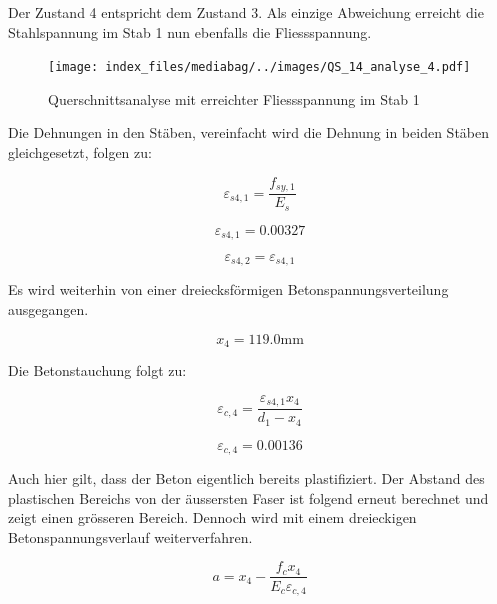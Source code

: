 \documentclass[
  12pt,
  letterpaper,
  egregdoesnotlikesansseriftitles]{scrreprt}
\begin{document}
Der Zustand 4 entspricht dem Zustand 3. Als einzige Abweichung erreicht
die Stahlspannung im Stab 1 nun ebenfalls die Fliessspannung.

\begin{figure}[H]

{\centering \texttt{[image: index\_files/mediabag/../images/QS\_14\_analyse\_4.pdf]}

}

\caption{\label{fig-qs5_sv14}Querschnittsanalyse mit erreichter
Fliessspannung im Stab 1}

\end{figure}

Die Dehnungen in den Stäben, vereinfacht wird die Dehnung in beiden
Stäben gleichgesetzt, folgen zu:

\begin{equation}\varepsilon_{s4,1} = \frac{f_{sy,1}}{E_{s}}\end{equation}

\begin{equation}\varepsilon_{s4,1} = 0.00327\end{equation}

\begin{equation}\varepsilon_{s4,2} = \varepsilon_{s4,1}\end{equation}

Es wird weiterhin von einer dreiecksförmigen Betonspannungsverteilung
ausgegangen.

\begin{equation}x_{4} = 119.0 \text{mm}\end{equation}

Die Betonstauchung folgt zu:

\begin{equation}\varepsilon_{c,4} = \frac{\varepsilon_{s4,1} x_{4}}{d_{1} - x_{4}}\end{equation}

\begin{equation}\varepsilon_{c,4} = 0.00136\end{equation}

Auch hier gilt, dass der Beton eigentlich bereits plastifiziert. Der
Abstand des plastischen Bereichs von der äussersten Faser ist folgend
erneut berechnet und zeigt einen grösseren Bereich. Dennoch wird mit
einem dreieckigen Betonspannungsverlauf weiterverfahren.

\begin{equation}a = x_{4} - \frac{f_{c} x_{4}}{E_{c} \varepsilon_{c,4}}\end{equation}
\end{document}
